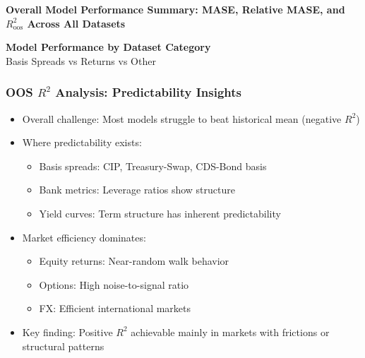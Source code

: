 \documentclass[ignorenonframetext, 9pt]{beamer}
\begin{document}
  \begin{frame}[plain]
    \tiny
    \vspace{-0.2cm}
    \centering
    \textbf{Overall Model Performance Summary: MASE, Relative MASE, and $R^2_{\text{oos}}$ Across All Datasets}\\
    \vspace{0.2cm}
    \resizebox{0.98\textwidth}{!}{}
  \end{frame}

  \begin{frame}[plain]
    \tiny
    \vspace{-0.2cm}
    \centering
    \textbf{Model Performance by Dataset Category}\\
    {\scriptsize Basis Spreads vs Returns vs Other}\\
    \vspace{0.2cm}
    \resizebox{0.98\textwidth}{!}{}
  \end{frame}

\begin{frame}
  \frametitle{OOS $R^2$ Analysis: Predictability Insights}
  \begin{itemize}
  \item \alert{Overall challenge:} Most models struggle to beat historical mean (negative $R^2$)
  \vspace{0.3cm}
  \item \alert{Where predictability exists:}
  \begin{itemize}
    \item Basis spreads: CIP, Treasury-Swap, CDS-Bond basis
    \item Bank metrics: Leverage ratios show structure
    \item Yield curves: Term structure has inherent predictability
  \end{itemize}
  \vspace{0.3cm}
  \item \alert{Market efficiency dominates:}
  \begin{itemize}
    \item Equity returns: Near-random walk behavior
    \item Options: High noise-to-signal ratio
    \item FX: Efficient international markets
  \end{itemize}
  \vspace{0.3cm}
  \item \alert{Key finding:} Positive $R^2$ achievable mainly in markets with frictions or structural patterns
  \end{itemize}
\end{frame}
\end{document}
